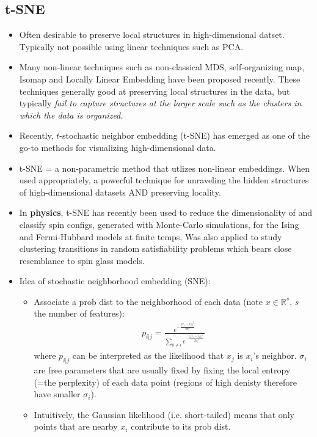 \documentclass[norsk,a4paper,11pt]{article}
\begin{document}
\subsection{t-SNE}
\begin{itemize}
	\item Often desirable to preserve local structures in high-dimensional datset. Typically not possible using linear techniques such as PCA.
	\item Many non-linear techniques such as non-classical MDS, self-organizing map, Isomap and Locally Linear Embedding have been proposed recently. These techniques generally good at preserving local structures in the data, but typically \textit{fail to capture structures at the larger scale such as the clusters in which the data is organized.} 
	\item Recently, $t$-stochastic neighbor embedding (t-SNE) has emerged as one of the go-to methods for visualizing high-dimensional data.
	\item t-SNE = a non-parametric method that utlizes non-linear embeddings. When used appropriately, a powerful technique for unraveling the hidden structures of high-dimensional datasets AND preserving locality.
	\item In \textbf{physics}, t-SNE has recently been used to reduce the dimensionality of and classify spin configs, generated with Monte-Carlo simulations, for the Ising and Fermi-Hubbard models at finite temps. Was also applied to study clustering transitions in random satisfiability problems which bears close resemblance to spin glass models.
	\item Idea of stochastic neighborhood embedding (SNE):
	\begin{itemize}
		\item Associate a prob dist to the neighborhood of each data (note $x \in \mathbb{R}^s$, $s$ the number of features):
		\begin{align}
			p_{i|j} = \frac{e^{-\frac{||x_i - x_j||^2}{2\sigma_i^2}}}{\sum_{k\neq i}e^{-\frac{||x_i - x_k||^2}{2\sigma_i^2}}}
		\end{align}
		where $p_{i|j}$ can be interpreted as the likelihood that $x_j$ is $x_i$'s neighbor. $\sigma_i$ are free parameters that are usually fixed by fixing the local entropy (=the perplexity) of each data point (regions of high denisty therefore have smaller $\sigma_i$). 
		\item Intuitively, the Gaussian likelihood (i.e. short-tailed) means that only points that are nearby $x_i$ contribute to its prob dist. 

\end{itemize}
\end{itemize}
\end{document}
